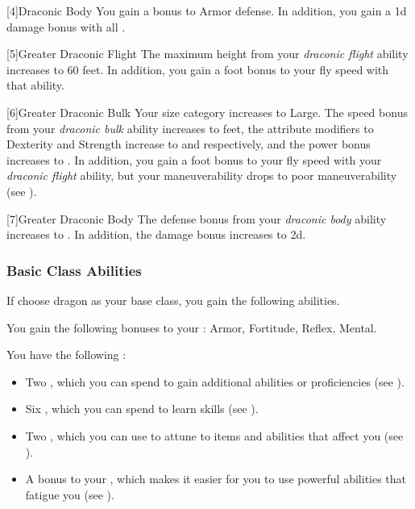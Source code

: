             [4]{Draconic Body} You gain a  bonus to Armor defense.
            In addition, you gain a \plus1d damage bonus with all .

            [5]{Greater Draconic Flight} The maximum height from your \textit{draconic flight} ability increases to 60 feet.
            In addition, you gain a  foot bonus to your fly speed with that ability.

            [6]{Greater Draconic Bulk} Your size category increases to Large.
            The speed bonus from your \textit{draconic bulk} ability increases to  feet, the attribute modifiers to Dexterity and Strength increase to  and  respectively, and the power bonus increases to .
            In addition, you gain a  foot bonus to your fly speed with your \textit{draconic flight} ability, but your maneuverability drops to poor maneuverability (see ).

            [7]{Greater Draconic Body} The defense bonus from your \textit{draconic body} ability increases to .
            In addition, the damage bonus increases to \plus2d.

        \subsubsection{Basic Class Abilities}
            If choose dragon as your base class, you gain the following abilities.

            You gain the following bonuses to your :  Armor,  Fortitude,  Reflex,  Mental.

             You have the following :
            \begin{itemize}
                \item Two , which you can spend to gain additional abilities or proficiencies (see ).
                \item Six , which you can spend to learn skills (see ).
                \item Two , which you can use to attune to items and abilities that affect you (see ).
                \item A  bonus to your , which makes it easier for you to use powerful abilities that fatigue you (see ).
            \end{itemize}

